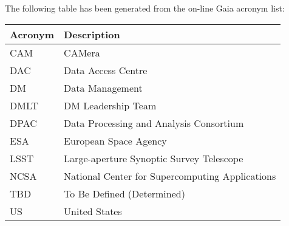The following table has been generated from the on-line Gaia acronym list:
\newline\newline%
\addtocounter{table}{-1}
\begin{longtable}{|l|p{}|}\hline 
\textbf{Acronym} & \textbf{Description}  \\\hline
CAM&CAMera \\\hline
DAC&Data Access Centre \\\hline
DM&Data Management \\\hline
DMLT&DM Leadership Team \\\hline
DPAC&Data Processing and Analysis Consortium \\\hline
ESA&European Space Agency \\\hline
LSST&Large-aperture Synoptic Survey Telescope \\\hline
NCSA&National Center for Supercomputing Applications \\\hline
TBD&To Be Defined (Determined) \\\hline
US&United States \\\hline
\end{longtable} 
